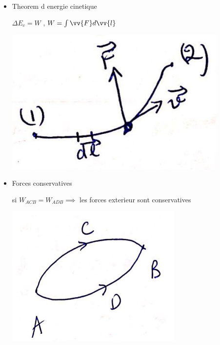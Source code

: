 \documentclass[12pt]{book}
\begin{document}
\begin{itemize}
                    \begin{itemize}
                        \item Theorem d energie cinetique \\
                            \begin{minipage}{0.49\linewidth}
                                $\Delta E_c = W$ , $W =\int\vv{F}d\vv{l}$
                            \end{minipage}
                            \begin{minipage}{0.39\linewidth}
                                \includegraphics[width = \linewidth]{pic/theoremdenergiecinetique.png}
                            \end{minipage}
                        \item Forces conservatives \\ 
                            \begin{minipage}{0.49\linewidth}
                                si $W_{ACB} = W_{ADB} \implies$ les forces exterieur sont conservatives 
                            \end{minipage}
                            \begin{minipage}{0.39\linewidth}
                                \includegraphics[width = \linewidth]{pic/frocesconservatives.png}

\end{minipage}
\end{itemize}
\end{itemize}
\end{document}
